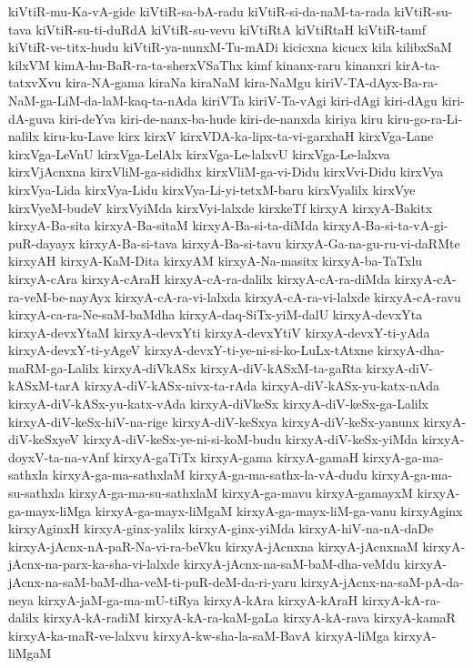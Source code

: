 {kiVtiR-mu-Ka-vA-gide
kiVtiR-sa-bA-radu
kiVtiR-si-da-naM-ta-rada
kiVtiR-su-tava
kiVtiR-su-ti-duRdA
kiVtiR-su-vevu
kiVtiRtA
kiVtiRtaH
kiVtiR-tamf
kiVtiR-ve-titx-hudu
kiVtiR-ya-nunxM-Tu-mADi
kicicxna
kicucx
kila
kilibxSaM
kilxVM
kimA-hu-BaR-ra-ta-sherxVSaThx
kimf
kinanx-raru
kinanxri
kirA-ta-tatxvXvu
kira-NA-gama
kiraNa
kiraNaM
kira-NaMgu
kiriV-TA-dAyx-Ba-ra-NaM-ga-LiM-da-laM-kaq-ta-nAda
kiriVTa
kiriV-Ta-vAgi
kiri-dAgi
kiri-dAgu
kiri-dA-guva
kiri-deYva
kiri-de-nanx-ba-hude
kiri-de-nanxda
kiriya
kiru
kiru-go-ra-Li-nalilx
kiru-ku-Lave
kirx
kirxV
kirxVDA-ka-lipx-ta-vi-garxhaH
kirxVga-Lane
kirxVga-LeVnU
kirxVga-LelAlx
kirxVga-Le-lalxvU
kirxVga-Le-lalxva
kirxVjAcnxna
kirxVliM-ga-sididhx
kirxVliM-ga-vi-Didu
kirxVvi-Didu
kirxVya
kirxVya-Lida
kirxVya-Lidu
kirxVya-Li-yi-tetxM-baru
kirxVyalilx
kirxVye
kirxVyeM-budeV
kirxVyiMda
kirxVyi-lalxde
kirxkeTf
kirxyA
kirxyA-Bakitx
kirxyA-Ba-sita
kirxyA-Ba-sitaM
kirxyA-Ba-si-ta-diMda
kirxyA-Ba-si-ta-vA-gi-puR-dayayx
kirxyA-Ba-si-tava
kirxyA-Ba-si-tavu
kirxyA-Ga-na-gu-ru-vi-daRMte
kirxyAH
kirxyA-KaM-Dita
kirxyAM
kirxyA-Na-masitx
kirxyA-ba-TaTxlu
kirxyA-cAra
kirxyA-cAraH
kirxyA-cA-ra-dalilx
kirxyA-cA-ra-diMda
kirxyA-cA-ra-veM-be-nayAyx
kirxyA-cA-ra-vi-lalxda
kirxyA-cA-ra-vi-lalxde
kirxyA-cA-ravu
kirxyA-ca-ra-Ne-saM-baMdha
kirxyA-daq-SiTx-yiM-dalU
kirxyA-devxYta
kirxyA-devxYtaM
kirxyA-devxYti
kirxyA-devxYtiV
kirxyA-devxY-ti-yAda
kirxyA-devxY-ti-yAgeV
kirxyA-devxY-ti-ye-ni-si-ko-LuLx-tAtxne
kirxyA-dha-maRM-ga-Lalilx
kirxyA-diVkASx
kirxyA-diV-kASxM-ta-gaRta
kirxyA-diV-kASxM-tarA
kirxyA-diV-kASx-nivx-ta-rAda
kirxyA-diV-kASx-yu-katx-nAda
kirxyA-diV-kASx-yu-katx-vAda
kirxyA-diVkeSx
kirxyA-diV-keSx-ga-Lalilx
kirxyA-diV-keSx-hiV-na-rige
kirxyA-diV-keSxya
kirxyA-diV-keSx-yanunx
kirxyA-diV-keSxyeV
kirxyA-diV-keSx-ye-ni-si-koM-budu
kirxyA-diV-keSx-yiMda
kirxyA-doyxV-ta-na-vAnf
kirxyA-gaTiTx
kirxyA-gama
kirxyA-gamaH
kirxyA-ga-ma-sathxla
kirxyA-ga-ma-sathxlaM
kirxyA-ga-ma-sathx-la-vA-dudu
kirxyA-ga-ma-su-sathxla
kirxyA-ga-ma-su-sathxlaM
kirxyA-ga-mavu
kirxyA-gamayxM
kirxyA-ga-mayx-liMga
kirxyA-ga-mayx-liMgaM
kirxyA-ga-mayx-liM-ga-vanu
kirxyAginx
kirxyAginxH
kirxyA-ginx-yalilx
kirxyA-ginx-yiMda
kirxyA-hiV-na-nA-daDe
kirxyA-jAcnx-nA-paR-Na-vi-ra-beVku
kirxyA-jAcnxna
kirxyA-jAcnxnaM
kirxyA-jAcnx-na-parx-ka-sha-vi-lalxde
kirxyA-jAcnx-na-saM-baM-dha-veMdu
kirxyA-jAcnx-na-saM-baM-dha-veM-ti-puR-deM-da-ri-yaru
kirxyA-jAcnx-na-saM-pA-da-neya
kirxyA-jaM-ga-ma-mU-tiRya
kirxyA-kAra
kirxyA-kAraH
kirxyA-kA-ra-dalilx
kirxyA-kA-radiM
kirxyA-kA-ra-kaM-gaLa
kirxyA-kA-rava
kirxyA-kamaR
kirxyA-ka-maR-ve-lalxvu
kirxyA-kw-sha-la-saM-BavA
kirxyA-liMga
kirxyA-liMgaM
}
